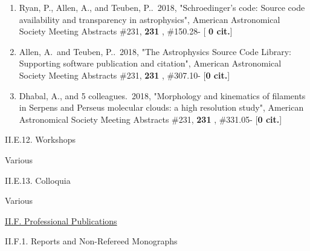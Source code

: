 \documentclass[11pt,letterpaper]{article}
\newcommand{\rsquo}{'}
\begin{document}
\begin{enumerate}[resume,label=\textbf{\arabic*}.]
\item  
Ryan, P., Allen, A., and Teuben, P..\  2018,  "Schroedinger{\rsquo}s code: 
Source code availability and transparency in astrophysics", American 
Astronomical Society Meeting Abstracts \#231,  {\bf 231} , \#150.28- [{\bf 
0 cit.}] 

\item  
Allen, A.~and Teuben, P..\  2018,  "The Astrophysics Source Code Library: 
Supporting software publication and citation", American Astronomical 
Society Meeting Abstracts \#231,  {\bf 231} , \#307.10- [{\bf 0 cit.}]

\item  
Dhabal, A., and 5 colleagues.\  2018,  "Morphology and kinematics of 
filaments in Serpens and Perseus molecular clouds: a high resolution 
study", American Astronomical Society Meeting Abstracts \#231,  {\bf 231} , 
\#331.05- [{\bf 0 cit.}] 

  
\end{enumerate}





II.E.12. Workshops

Various

II.E.13. Colloquia

Various




\underline{II.F. Professional Publications}

II.F.1. Reports and Non-Refereed Monographs
\end{document}
